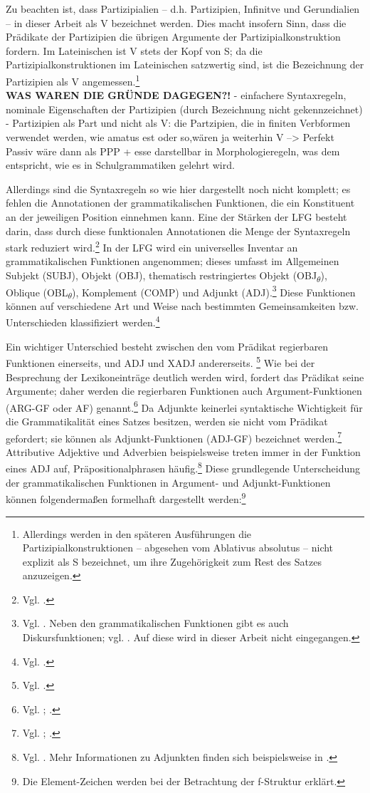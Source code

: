 \documentclass[12pt,a4paper]{article}
\begin{document}
Zu beachten ist, dass Partizipialien – d.h. Partizipien, Infinitve und Gerundialien -- in dieser Arbeit als V bezeichnet werden. Dies macht insofern Sinn, dass die Prädikate der Partizipien die übrigen Argumente der Partizipialkonstruktion fordern. Im Lateinischen ist V stets der Kopf von S; da die Partizipialkonstruktionen im Lateinischen satzwertig sind, ist die Bezeichnung der Partizipien als V angemessen.\footnote{Allerdings werden in den späteren Ausführungen die Partizipialkonstruktionen -- abgesehen vom Ablativus absolutus -- nicht explizit als S bezeichnet, um ihre Zugehörigkeit zum Rest des Satzes anzuzeigen.}\\
\textbf{WAS WAREN DIE GRÜNDE DAGEGEN?!} 
- einfachere Syntaxregeln, nominale Eigenschaften der Partizipien (durch Bezeichnung nicht gekennzeichnet)
- Partizipien als Part und nicht als V: die Partzipien, die in finiten Verbformen verwendet werden, wie amatus est oder so,wären ja weiterhin V --> Perfekt Passiv wäre dann als PPP + esse darstellbar in Morphologieregeln, was dem entspricht, wie es in Schulgrammatiken gelehrt wird.

Allerdings sind die Syntaxregeln so wie hier dargestellt noch nicht komplett; es fehlen die Annotationen der grammatikalischen Funktionen, die ein Konstituent an der jeweiligen Position einnehmen kann. Eine der Stärken der LFG besteht darin, dass durch diese funktionalen Annotationen die Menge der Syntaxregeln stark reduziert wird.\footnote{Vgl. \cite[45]{Dal}.} In der LFG wird ein universelles Inventar an grammatikalischen Funktionen angenommen; dieses umfasst im Allgemeinen Subjekt (SUBJ), Objekt (OBJ), thematisch restringiertes Objekt (OBJ\textsubscript{$\theta$}), Oblique (OBL\textsubscript{$\theta$}), Komplement (COMP) und Adjunkt (ADJ).\footnote{Vgl. \cite[9]{Dal}. Neben den grammatikalischen Funktionen gibt es auch Diskursfunktionen; vgl. \cite[28; 76-84; 94-101]{Skript}. Auf diese wird in dieser Arbeit nicht eingegangen.} Diese Funktionen können auf verschiedene Art und Weise nach bestimmten Gemeinsamkeiten bzw. Unterschieden klassifiziert werden.\footnote{Vgl. \cite[56-8]{Falk}.} 

Ein wichtiger Unterschied besteht zwischen den vom Prädikat regierbaren Funktionen einerseits, und ADJ und XADJ andererseits. \footnote{Vgl. \cite[56]{Falk}.} Wie bei der Besprechung der Lexikoneinträge deutlich werden wird, fordert das Prädikat seine Argumente; daher werden die regierbaren Funktionen auch Argument-Funktionen (ARG-GF oder AF) genannt.\footnote{Vgl. \cite[28]{Skript}; \cite[58]{Falk}.} Da Adjunkte keinerlei syntaktische Wichtigkeit für die Grammatikalität eines Satzes besitzen, werden sie nicht vom Prädikat gefordert; sie können als Adjunkt-Funktionen (ADJ-GF) bezeichnet werden.\footnote{Vgl. \cite[10-1]{Dal}; \cite[38]{Skript}.} Attributive Adjektive und Adverbien beispielsweise treten immer in der Funktion eines ADJ auf, Präpositionalphrasen häufig.\footnote{Vgl. \cite[38]{Skript}. Mehr Informationen zu Adjunkten finden sich beispielsweise in \cite[61-2]{Falk}.} Diese grundlegende Unterscheidung der grammatikalischen Funktionen in Argument- und Adjunkt-Funktionen können folgendermaßen formelhaft dargestellt werden:\footnote{Die Element-Zeichen werden bei der Betrachtung der f-Struktur erklärt.}
\end{document}
